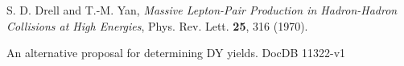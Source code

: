 \documentclass[11pt]{article}
\begin{document}
\clearpage
\begin{thebibliography}{99}
    S. D. Drell and T.-M. Yan,
    \textit{Massive Lepton-Pair Production in Hadron-Hadron Collisions at High Energies},
    Phys. Rev. Lett. \textbf{25}, 316 (1970).
    
    An alternative proposal for determining DY yields. DocDB 11322-v1
    
\end{thebibliography}
\end{document}
